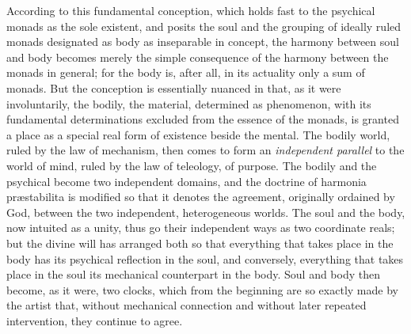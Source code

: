 According to this fundamental conception, which holds fast to the
psychical monads as the sole existent, and posits the soul and the
grouping of ideally ruled monads designated as body as inseparable in
concept, the harmony between soul and body becomes merely the simple
consequence of the harmony between the monads in general; for the body
is, after all, in its actuality only a sum of monads. But the conception
is essentially nuanced in that, as it were involuntarily, the bodily,
the material, determined as phenomenon, with its fundamental
determinations excluded from the essence of the monads, is granted a
place as a special real form of existence beside the mental. The bodily
world, ruled by the law of mechanism, then comes to form an
\emph{independent parallel} to the world of mind, ruled by the law of
teleology, of purpose. The bodily and the psychical become two
independent domains, and the doctrine of harmonia præstabilita is
modified so that it denotes the agreement, originally ordained by God,
between the two independent, heterogeneous worlds. The soul and the
body, now intuited as a unity, thus go their independent ways as two
coordinate reals; but the divine will has arranged both so that
everything that takes place in the body has its psychical reflection in
the soul, and conversely, everything that takes place in the soul its
mechanical counterpart in the body. Soul and body then become, as it
were, two clocks, which from the beginning are so exactly made by the
artist that, without mechanical connection and without later repeated
intervention, they continue to agree.

